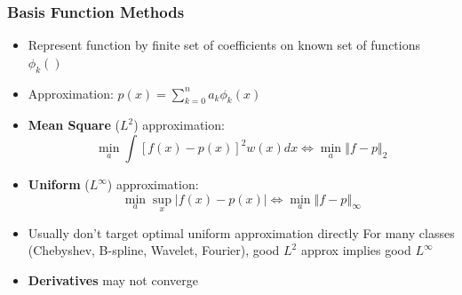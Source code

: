 \documentclass[bigger]{beamer}
\begin{document}
\begin{frame}

\frametitle{Basis Function Methods}

\begin{itemize}

\item Represent function by finite set of coefficients on known set of functions $\phi_k()$

\item Approximation: $p(x)=\sum_{k=0}^{n}a_{k}\phi _{k}(x)$

\item \textbf{Mean Square} ($L^{2}$) approximation: 
\begin{equation*}
\min_{a}\int \left[ f(x)-p(x)\right] ^{2}w(x)dx\Leftrightarrow
\min_{a}\left\Vert f-p\right\Vert _{2}
\end{equation*}

\item \textbf{Uniform} ($L^{\infty }$) approximation: 
\begin{equation*}
\min_{a}\sup_{x}\left\vert f(x)-p(x)\right\vert \Leftrightarrow
\min_{a}\left\Vert f-p\right\Vert _{\infty }
\end{equation*}

\item Usually don't target optimal uniform approximation directly \newline
For many classes (Chebyshev, B-spline, Wavelet, Fourier), good $L^2$ approx implies good $L^\infty$ 

\item \textbf{Derivatives} may not converge
\end{itemize}


\end{frame}%
\end{document}
